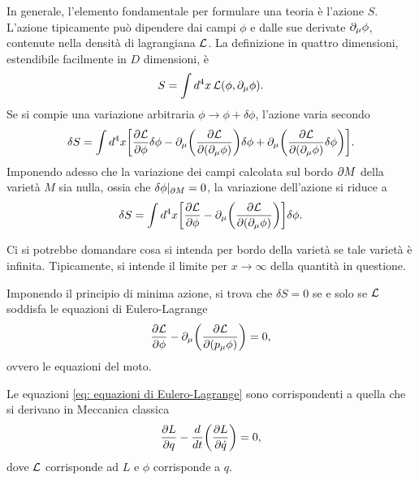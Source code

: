 In generale, l'elemento fondamentale per formulare una teoria è l'azione $S$. L'azione tipicamente può dipendere dai campi $\phi$ e dalle sue derivate $\partial_\mu \phi$, contenute nella densità di lagrangiana $\mathcal{L}$. La definizione in quattro dimensioni, estendibile facilmente in $D$ dimensioni, è 
\begin{equation}
\label{eq: definizione dell'azione in 4 dimensioni}
    S = \int d^4x\,\mathcal{L}(\phi,\partial_\mu \phi).
\end{equation}
Se si compie una variazione arbitraria $\phi \to \phi + \delta\phi$, l'azione varia secondo
\begin{equation}
    \delta S = \int d^4x\bigg[\frac{\partial\mathcal{L}}{\partial\phi}\delta\phi - \partial_\mu\bigg(\frac{\partial\mathcal{L}}{\partial(\partial_\mu\phi)}\bigg)\delta\phi + \partial_\mu\bigg(\frac{\partial\mathcal{L}}{\partial(\partial_\mu\phi)}\delta\phi\bigg)\bigg].
\end{equation}
Imponendo adesso che la variazione dei campi calcolata sul bordo $\partial M$ della varietà $M$ sia nulla, ossia che $\delta\phi|_{\partial M} = 0$, la variazione dell'azione si riduce a
\begin{equation}
    \delta S = \int d^4x\bigg[\frac{\partial\mathcal{L}}{\partial\phi} - \partial_\mu\bigg(\frac{\partial\mathcal{L}}{\partial(\partial_\mu\phi)}\bigg)\bigg]\delta\phi.
\end{equation}
\begin{obs}
    Ci si potrebbe domandare cosa si intenda per bordo della varietà se tale varietà è infinita. Tipicamente, si intende il limite per $x \to \infty$ della quantità in questione.
\end{obs}
Imponendo il principio di minima azione, si trova che $\delta S = 0$ se e solo se $\mathcal{L}$ soddisfa le equazioni di Eulero-Lagrange
\begin{equation}
\label{eq: equazioni di Eulero-Lagrange}
    \frac{\partial\mathcal{L}}{\partial\phi} - \partial_\mu\bigg(\frac{\partial\mathcal{L}}{\partial(p_\mu\phi)}\bigg) = 0,
\end{equation}
ovvero le equazioni del moto.
\begin{obs}
    Le equazioni \eqref{eq: equazioni di Eulero-Lagrange} sono corrispondenti a quella che si derivano in Meccanica classica
    \begin{equation}
        \frac{\partial L}{\partial q} - \frac{d}{dt}\bigg(\frac{\partial L}{\partial \dot{q}}\bigg) = 0,
    \end{equation}
    dove $\mathcal{L}$ corrisponde ad $L$ e $\phi$ corrisponde a $q$.
\end{obs}

